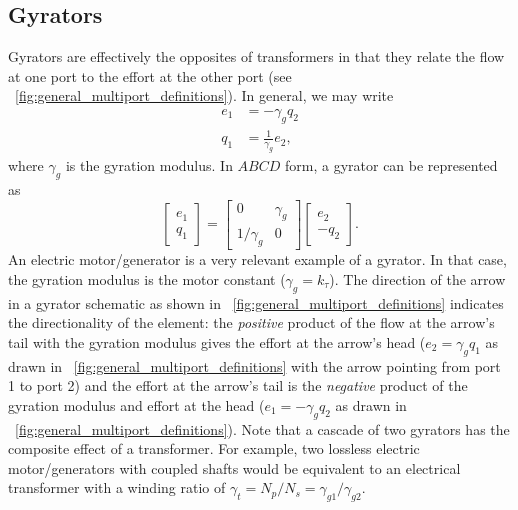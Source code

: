 \documentclass[5p,times]{elsarticle}
\begin{document}
\subsection{Gyrators}\label{sec:gyrators}
Gyrators are effectively the opposites of transformers in that they relate the flow at one port to the effort at the other port (see \figurename~\ref{fig:general_multiport_definitions}).
In general, we may write
%
\begin{subequations}
        \begin{align}
               e_1 &= - \gamma_g q_2 \\
               q_1 &= \frac{1}{\gamma_g} e_2 ,
        \end{align}
        \label{eq:gyrator_eom}%
\end{subequations}
%
where $\gamma_g$ is the gyration modulus.
In $ABCD$ form, a gyrator can be represented as
%
\begin{equation}
        \begin{bmatrix}
                e_1 \\ q_1
        \end{bmatrix}
        =
        \begin{bmatrix}
                0 & \gamma_g \\ 1/\gamma_g & 0
        \end{bmatrix}
        \begin{bmatrix}
                e_2 \\ - q_2
        \end{bmatrix} .
        \label{eq:gyrator_abcd}
\end{equation}
%
An electric motor/generator is a very relevant example of a gyrator.
In that case, the gyration modulus is the motor constant ($\gamma_g=k_\tau$).
The direction of the arrow in a gyrator schematic as shown in \figurename~\ref{fig:general_multiport_definitions} indicates the directionality of the element: the \emph{positive} product of the flow at the arrow's tail with the gyration modulus gives the effort at the arrow's head ($e_2 = \gamma_g q_1$ as drawn in \figurename~\ref{fig:general_multiport_definitions} with the arrow pointing from port 1 to port 2) and the effort at the arrow's tail is the \emph{negative} product of the gyration modulus and effort at the head ($e_1= - \gamma_g q_2$ as drawn in \figurename~\ref{fig:general_multiport_definitions}).
Note that a cascade of two gyrators has the composite effect of a transformer.
For example, two lossless electric motor/generators with coupled shafts would be equivalent to an electrical transformer with a winding ratio of $\gamma_t=N_p/N_s=\gamma_{g1}/\gamma_{g2}$.
\end{document}
